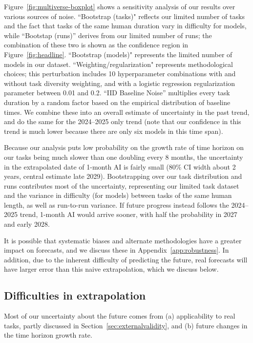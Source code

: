 \documentclass{article}
\begin{document}
Figure~\ref{fig:multiverse-boxplot} shows a sensitivity analysis of our results over various sources of noise. ``Bootstrap (tasks)" reflects our limited number of tasks and the fact that tasks of the same human duration vary in difficulty for models, while ``Bootstap (runs)'' derives from our limited number of runs; the combination of these two is shown as the confidence region in Figure~\ref{fig:headline}. ``Bootstrap (models)" represents the limited number of models in our dataset. ``Weighting/regularization" represents methodological choices; this perturbation includes 10 hyperparameter combinations with and without task diversity weighting, and with a logistic regression regularization parameter between 0.01 and 0.2. ``IID Baseline Noise'' multiplies every task duration by a random factor based on the empirical distribution of baseline times. We combine these into an overall estimate of uncertainty in the past trend, and do the same for the 2024--2025 only trend (note that our confidence in this trend is much lower because there are only six models in this time span).

Because our analysis puts low probability on the growth rate of time horizon on our tasks being much slower than one doubling every 8 months, the uncertainty in the extrapolated date of 1-month AI is fairly small (80\% CI width about 2 years, central estimate late 2029). Bootstrapping over our task distribution and runs contributes most of the uncertainty, representing our limited task dataset and the variance in difficulty (for models) between tasks of the same human length, as well as run-to-run variance. If future progress instead follows the 2024--2025 trend, 1-month AI would arrive sooner, with half the probability in 2027 and early 2028. 

It is possible that systematic biases and alternate methodologies have a greater impact on forecasts, and we discuss these in Appendix~\ref{app:robustness}. In addition, due to the inherent difficulty of predicting the future, real forecasts will have larger error than this naive extrapolation, which we discuss below.

\subsection{Difficulties in extrapolation} \label{sec:predicting-future-trends}

Most of our uncertainty about the future comes from (a) applicability to real tasks, partly discussed in Section~\ref{sec:externalvalidity}, and (b) future changes in the time horizon growth rate. 
\end{document}
